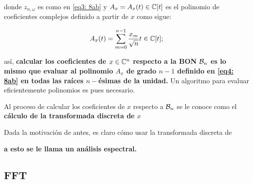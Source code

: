 \noindent
donde $z_{n, \omega}$ es como en \eqref{eq3: 8ab} y 
$A_{x} = A_{x}(t) \in \mathbb{C}[t]$ es el polinomio de 
coeficientes complejos definido 
a partir de $x$ como sigue:

	\begin{equation}
		\label{eq4: 8ab}
		A_{x}(t) = \sum\limits_{m=0}^{n-1}\frac{x_{m}}{\sqrt{n}} t\in \mathbb{C}[t];
	\end{equation}

\noindent
así, \textbf{calcular los coeficientes de $x \in \mathbb{C}^{n}$ respecto
a la BON $\mathcal{B}_{n}$ es lo mismo que evaluar al polinomio 
$A_{x}$ de grado $n-1$ definido en \eqref{eq4: 8ab} en todas las raíces
$n-$ésimas de la unidad.} Un algoritmo para evaluar eficientemente
polinomios es pues necesario.

\begin{defi}
Al proceso de calcular los coeficientes de $x$
respecto a $\mathcal{B}_{n}$
se le conoce como el \textbf{cálculo de la 
transformada discreta de $x$}
\end{defi}


Dada la motivación de antes, es claro cómo usar la transformada
discreta de 

\textbf{a esto se le llama un análisis espectral.}

\subsection{FFT}





















